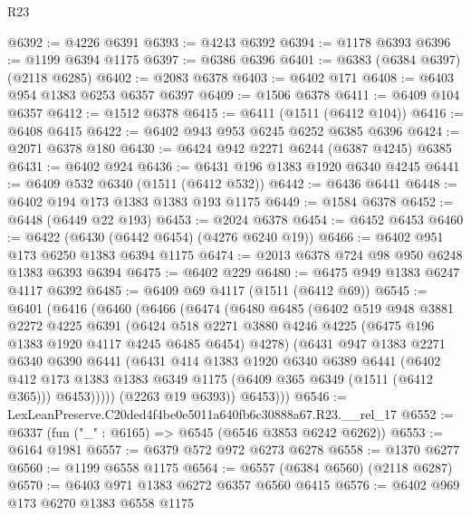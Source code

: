 \begin{lexlean}{R23}
\begin{coremodule}
@6392 := @4226 @6391
@6393 := @4243 @6392
@6394 := @1178 @6393
@6396 := @1199 @6394 @1175
@6397 := @6386 @6396
@6401 := @6383 (@6384 @6397) (@2118 @6285)
@6402 := @2083 @6378
@6403 := @6402 @171
@6408 := @6403 @954 @1383 @6253 @6357 @6397
@6409 := @1506 @6378
@6411 := @6409 @104 @6357
@6412 := @1512 @6378
@6415 := @6411 (@1511 (@6412 @104))
@6416 := @6408 @6415
@6422 := @6402 @943 @953 @6245 @6252 @6385 @6396
@6424 := @2071 @6378 @180
@6430 := @6424 @942 @2271 @6244 (@6387 @4245) @6385
@6431 := @6402 @924
@6436 := @6431 @196 @1383 @1920 @6340 @4245
@6441 := @6409 @532 @6340 (@1511 (@6412 @532))
@6442 := @6436 @6441
@6448 := @6402 @194 @173 @1383 @1383 @193 @1175
@6449 := @1584 @6378
@6452 := @6448 (@6449 @22 @193)
@6453 := @2024 @6378
@6454 := @6452 @6453
@6460 := @6422 (@6430 (@6442 @6454) (@4276 @6240 @19))
@6466 := @6402 @951 @173 @6250 @1383 @6394 @1175
@6474 := @2013 @6378 @724 @98 @950 @6248 @1383 @6393 @6394
@6475 := @6402 @229
@6480 := @6475 @949 @1383 @6247 @4117 @6392
@6485 := @6409 @69 @4117 (@1511 (@6412 @69))
@6545 := @6401
    (@6416
      (@6460
        (@6466
          (@6474
            (@6480
              @6485
              (@6402
                @519
                @948
                @3881
                @2272
                @4225
                @6391
                (@6424
                  @518
                  @2271
                  @3880
                  @4246
                  @4225
                  (@6475 @196 @1383 @1920 @4117 @4245 @6485 @6454)
                  @4278)
                (@6431
                  @947
                  @1383
                  @2271
                  @6340
                  @6390
                  @6441
                  (@6431
                    @414
                    @1383
                    @1920
                    @6340
                    @6389
                    @6441
                    (@6402
                      @412
                      @173
                      @1383
                      @1383
                      @6349
                      @1175
                      (@6409 @365 @6349 (@1511 (@6412 @365)))
                      @6453)))))
            (@2263 @19 @6393))
          @6453)))
@6546 := LexLeanPreserve.C20ded4f4be0e5011a640fb6c30888a67.R23.__rel_17
@6552 := @6337 (fun ("_" : @6165) => @6545 (@6546 @3853 @6242 @6262))
@6553 := @6164 @1981
@6557 := @6379 @572 @972 @6273 @6278
@6558 := @1370 @6277
@6560 := @1199 @6558 @1175
@6564 := @6557 (@6384 @6560) (@2118 @6287)
@6570 := @6403 @971 @1383 @6272 @6357 @6560 @6415
@6576 := @6402 @969 @173 @6270 @1383 @6558 @1175

\end{coremodule}
\end{lexlean}
